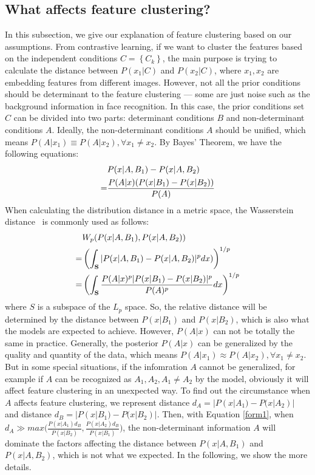 \documentclass[a4paper,fleqn]{cas-dc}
\begin{document}
\subsection{What affects feature clustering?}\label{explanation}
In this subsection, we give our explanation of feature clustering based on our assumptions. 
From contrastive learning, if we want to cluster the features based on the independent conditions $C=\left\{C_{k}\right\}$, the main purpose is trying to calculate the distance between $P(x_{1}|C)$ and $P(x_{2}|C)$, where $x_1, x_2$ are embedding features from different images. However, not all the prior conditions should be determinant to the feature clustering --- some are just noise such as the background information in face recognition. In this case, the prior conditions set $C$ can be divided into two parts: determinant conditions $B$ and non-determinant conditions $A$. Ideally, the non-determinant conditions $A$ should be unified, which means $P(A|x_{1})\equiv P(A|x_{2}), \forall x_{1}\ne x_{2}$. By Bayes' Theorem, we have the following equations:
\begin{equation}
\centering
\begin{split}
     & P(x|A,B_{1}) - P(x|A,B_{2})\\ 
    = & \frac{P(A|x)(P(x|B_{1})-P(x|B_{2}))}{P(A)}
\end{split}
\label{form1}
\end{equation}
When calculating the distribution distance in a metric space, the Wasserstein distance~\cite{wdistance} is commonly used as follows:
\begin{equation}
\centering
\begin{split}
   &W_{p}(P(x|A,B_{1}),P(x|A,B_{2})) \\= &\left(\int_{\mathbf{S}} |P(x|A,B_{1}) - P(x|A,B_{2})|^{p}dx)\right) ^{1/p}\\ 
    = & \left(\int_{\mathbf{S}}\frac{P(A|x)^{p}|P(x|B_{1})-P(x|B_{2})|^{p}}{P(A)^{p}}dx\right)^{1/p}
\end{split}
\label{form2}
\end{equation}
where $S$ is a subspace of the $L_{p}$ space. So, the relative distance will be determined by the distance between $P(x|B_{1})$ and $P(x|B_{2})$, which is also what the models are expected to achieve. However, $P(A|x)$ can not be totally the same in practice. Generally, the posterior $P(A|x)$ can be generalized by the quality and quantity of the data, which means $P(A|x_{1}) \approx P(A|x_{2}), \forall x_{1}\ne x_{2}$. But in some special situations, if the infomration $A$ cannot be generalized, for example if $A$ can be recognized as $A_{1}, A_{2}, A_{1}\ne A_{2}$ by the model, obviously it will affect feature clustering in an unexpected way. To find out the circumstance when $A$ affects feature clustering, we represent distance $d_{A}=|P(x|A_{1})-P(x|A_{2})|$ and distance $d_{B}=|P(x|B_{1})-P(x|B_{2})|$.  Then, with Equation \ref{form1}, when $d_{A} \gg max\big(\frac{P(x|A_{1})d_{B}}{P(x|B_{2})},\frac{P(x|A_{2})d_{B}}{P(x|B_{1})}\big)$, the non-determinant information $A$ will dominate the factors affecting the distance between $P(x|A,B_{1})$ and $P(x|A,B_{2})$, which is not what we expected. In the following, we show the more details.\par
\end{document}
